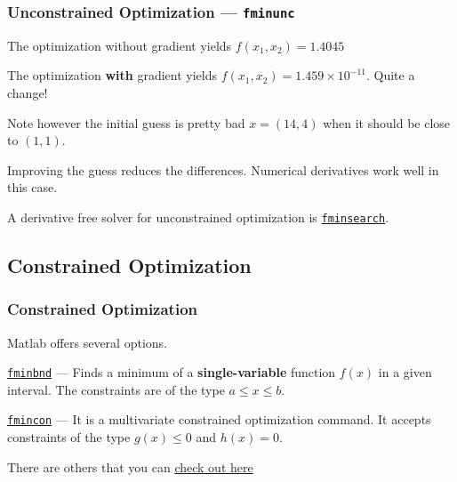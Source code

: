 \documentclass[11pt,xcolor={svgnames},aspectratio=169,usepdftitle=false]{beamer}
\let\toneitemize\itemize
\let\ttwoitemize\enditemize
\renewenvironment{itemize}{\toneitemize\addtolength{\itemsep}{0.7\baselineskip}}{\ttwoitemize}
\begin{document}
\begin{frame}[fragile]
  \frametitle{Unconstrained Optimization --- \texttt{fminunc}}
  \begin{itemize}
    \item The optimization without gradient yields $f(x_1,x_2) = 1.4045$
    \item The optimization \alert{\textbf{with}} gradient yields $f(x_1,x_2) = 1.459\times 10^{-11}$. Quite a change!
    \item Note however the initial guess is pretty bad $x = (14, 4)$ when it should be close to $(1,1)$.
    \item Improving the guess reduces the differences. Numerical derivatives work well in this case.
    \item A derivative free solver for unconstrained optimization is \href{https://www.mathworks.com/help/matlab/ref/fminsearch.html}{\texttt{fminsearch}}.
  \end{itemize}
\end{frame}

\subsection{Constrained Optimization}

\begin{frame}
  \frametitle{Constrained Optimization}
\begin{itemize}
  \item Matlab offers several options.
  \item \href{https://www.mathworks.com/help/matlab/ref/fminbnd.html?s_tid=doc_ta}{\texttt{fminbnd}} --- Finds a minimum of a \alert{\textbf{single-variable}} function $f(x)$ in a given interval. The constraints are of the type $a\leq x \leq b$.
  \item \href{https://www.mathworks.com/help/optim/ug/fmincon.html}{\texttt{fmincon}} --- It is a multivariate constrained optimization command. It accepts constraints of the type $g(x)\leq 0$ and $h(x) = 0$. 
  \item There are others that you can \href{https://www.mathworks.com/help/optim/ug/problems-handled-by-optimization-toolbox-functions.html\#tblminprobs}{check out here}
\end{itemize}
\end{frame}
\end{document}
